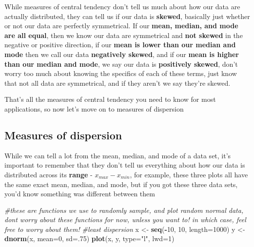 \documentclass[
]{article}
\newenvironment{Shaded}{\begin{snugshade}}{\end{snugshade}}
\newcommand{\CommentTok}[1]{\textcolor[rgb]{0.56,0.35,0.01}{\textit{#1}}}
\newcommand{\DataTypeTok}[1]{\textcolor[rgb]{0.13,0.29,0.53}{#1}}
\newcommand{\DecValTok}[1]{\textcolor[rgb]{0.00,0.00,0.81}{#1}}
\newcommand{\KeywordTok}[1]{\textcolor[rgb]{0.13,0.29,0.53}{\textbf{#1}}}
\newcommand{\NormalTok}[1]{#1}
\newcommand{\OperatorTok}[1]{\textcolor[rgb]{0.81,0.36,0.00}{\textbf{#1}}}
\newcommand{\StringTok}[1]{\textcolor[rgb]{0.31,0.60,0.02}{#1}}
\begin{document}
While measures of central tendency don't tell us much about how our data
are actually distributed, they can tell us if our data is
\textbf{skewed}, basically just whether or not our data are perfectly
symmetrical. If our \textbf{mean, median, and mode are all equal}, then
we know our data are symmetrical and \textbf{not skewed} in the negative
or positive direction, if our \textbf{mean is lower than our median and
mode} then we call our data \textbf{negatively skewed}, and if our
\textbf{mean is higher than our median and mode}, we say our data is
\textbf{positively skewed}, don't worry too much about knowing the
specifics of each of these terms, just know that not all data are
symmetrical, and if they aren't we say they're skewed.

That's all the measures of central tendency you need to know for most
applications, so now let's move on to measures of dispersion

\hypertarget{measures-of-dispersion}{%
\subsection{Measures of dispersion}\label{measures-of-dispersion}}

While we can tell a lot from the mean, median, and mode of a data set,
it's important to remember that they don't tell us everything about how
our data is distributed across its \textbf{range} - \(x_{max}-x_{min}\),
for example, these three plots all have the same exact mean, median, and
mode, but if you got these three data sets, you'd know something was
different between them

\begin{Shaded}
\begin{Highlighting}[]
\CommentTok{\#these are functions we use to randomly sample, and plot random normal data, don\textquotesingle{}t worry about these functions for now, unless you want to! in which case, feel free to worry about them!}
\CommentTok{\#least dispersion}
\NormalTok{x \textless{}{-}}\StringTok{ }\KeywordTok{seq}\NormalTok{(}\OperatorTok{{-}}\DecValTok{10}\NormalTok{, }\DecValTok{10}\NormalTok{, }\DataTypeTok{length=}\DecValTok{1000}\NormalTok{)}
\NormalTok{y \textless{}{-}}\StringTok{ }\KeywordTok{dnorm}\NormalTok{(x, }\DataTypeTok{mean=}\DecValTok{0}\NormalTok{, }\DataTypeTok{sd=}\NormalTok{.}\DecValTok{75}\NormalTok{)}
\KeywordTok{plot}\NormalTok{(x, y, }\DataTypeTok{type=}\StringTok{"l"}\NormalTok{, }\DataTypeTok{lwd=}\DecValTok{1}\NormalTok{)}
\end{Highlighting}
\end{Shaded}
\end{document}
